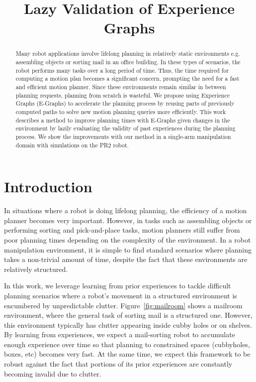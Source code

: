 \documentclass[letterpaper, 10 pt, conference]{ieeeconf}  %
\title{\LARGE \bf
Lazy Validation of Experience Graphs
}
\author{
\authorblockN{Victor Hwang}
\authorblockA{vchwang@andrew.cmu.edu\\
Carnegie Mellon University}
\and
\authorblockN{Mike Phillips}
\authorblockA{mlphilli@andrew.cmu.edu\\
Carnegie Mellon University}
\and
\authorblockN{Siddhartha Srinivasa}
\authorblockA{siddh@cs.cmu.edu\\
Carnegie Mellon University}
\and
\authorblockN{Maxim Likhachev}
\authorblockA{maxim@cs.cmu.edu\\
Carnegie Mellon University}
}
\newcommand{\figref}[1]{Figure~\ref{fig:#1}}
\begin{document}
\maketitle
\thispagestyle{empty}
\pagestyle{empty}


\begin{abstract}

Many robot applications involve lifelong planning in relatively static
environments e.g. assembling objects or sorting mail in an office building.  In
these types of scenarios, the robot performs many tasks over a long period of
time. Thus, the time required for computing a motion plan becomes a significant
concern, prompting the need for a fast and efficient motion planner.  Since
these environments remain similar in between planning requests, planning from
scratch is wasteful. We propose using Experience Graphs (E-Graphs) to accelerate
the planning process by reusing parts of previously computed paths to solve new
motion planning queries more efficiently.  This work describes a method to
improve planning times with E-Graphs given changes in the environment by lazily
evaluating the validity of past experiences during the planning process. We show
the improvements with our method in a single-arm manipulation domain with
simulations on the PR2 robot.

\end{abstract}


\section{Introduction}
In situations where a robot is doing lifelong planning, the efficiency of a
motion planner becomes very important. However, in tasks such as assembling
objects or performing sorting and pick-and-place tasks, motion planners still
suffer from poor planning times depending on the complexity of the environment.
In a robot manipulation environment, it is simple to find standard scenarios
where planning takes a non-trivial amount of time, despite the fact that these
environments are relatively structured.

In this work, we leverage learning from prior experiences to tackle difficult
planning scenarios where a robot's movement in a structured environment is
encumbered by unpredictable clutter. \figref{mailroom} shows a mailroom environment,
where the general task of sorting mail is a structured one. However, this
environment typically has clutter appearing inside cubby holes or on shelves.
By learning from experiences, we expect a mail-sorting robot to accumulate
enough experience over time so that planning to constrained spaces (cubbyholes,
boxes, etc) becomes very fast. At the same time, we expect this framework to be
robust against the fact that portions of its prior experiences are constantly
becoming invalid due to clutter.
\end{document}

